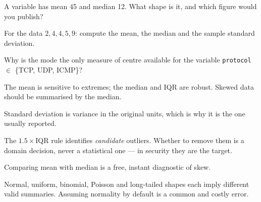 \begin{checkpoint}
\begin{tightnum}
  \item A variable has mean 45 and median 12. What shape is it, and which figure
        would you publish?
  \item For the data $2, 4, 4, 5, 9$: compute the mean, the median and the sample
        standard deviation.
  \item Why is the mode the only measure of centre available for the variable
        \texttt{protocol} $\in$ \{TCP, UDP, ICMP\}?
\end{tightnum}
\end{checkpoint}

\begin{chaptersummary}
\begin{tight}
  \item The mean is sensitive to extremes; the median and IQR are robust. Skewed
        data should be summarised by the median.
  \item Standard deviation is variance in the original units, which is why it is
        the one usually reported.
  \item The $1.5\times$IQR rule identifies \emph{candidate} outliers. Whether to
        remove them is a domain decision, never a statistical one --- in security
        they are the target.
  \item Comparing mean with median is a free, instant diagnostic of skew.
  \item Normal, uniform, binomial, Poisson and long-tailed shapes each imply
        different valid summaries. Assuming normality by default is a common and
        costly error.
\end{tight}
\end{chaptersummary}

